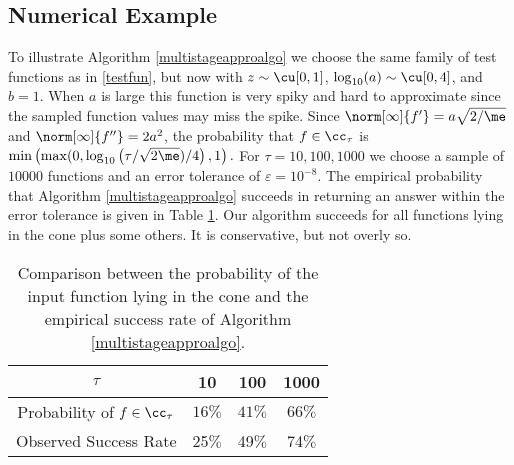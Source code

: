 \subsection{Numerical Example}

To illustrate Algorithm \ref{multistageapproalgo} we choose the same  family of test functions as in \eqref{testfun}, but now with $z \sim \cu[0,1]$, $\log_{10}(a) \sim \cu[0,4]$, and $b=1$. When $a$ is large this function is very spiky and hard to approximate since the sampled function values may miss the spike.  Since $\norm[\infty]{f'}=a\sqrt{2/\me}$ and $\norm[\infty]{f''}=2a^2$, the probability that $f \in \cc_{\tau}$ is $\min\left(\max(0,\log_{10}\left(\tau/\sqrt{2\me})/4\right),1\right).$
For $\tau = 10, 100 , 1000$ we choose a sample of  $10000$ functions and an error tolerance of  $\varepsilon = 10^{-8}$.  The empirical probability that Algorithm \ref{multistageapproalgo} succeeds in returning an answer within the error tolerance is given in Table \ref{approxnumerical}.  Our algorithm succeeds for all functions lying in the cone plus some others.  It is conservative, but not overly so.
\begin{table}[h]
\centering
\begin{tabular}{cccc}
$\tau$ &  10 & 100 & 1000\\
\toprule
Probability of $f \in \cc_{\tau}$ &  $ 16 \%$ &  $41 \%$  & $66 \%$ \\
Observed Success Rate & 25$\%$ &  49$\%$  & 74$\%$ \\
\end{tabular}
\caption{Comparison between the probability of the input function lying in the cone and the empirical success rate of Algorithm \ref{multistageapproalgo}.  \label{approxnumerical}}
\end{table}




